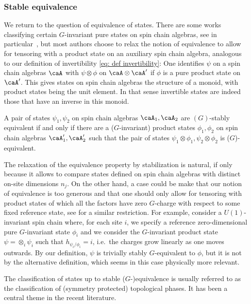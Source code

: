 \subsubsection{Stable equivalence}   \label{sec: stable equivalence}
We return to the question of equivalence of states.  There are some works classifying certain $G$-invariant pure states on spin chain algebras, see in particular~\cite{ogata2021classification}, 
but most authors \cite{kitaev2009periodic,chen_gu_wen_2011,kapustin2021classification} choose to relax the notion of equivalence to allow for tensoring with a product state on an auxiliary spin chain algebra, analogous to our 
definition
of invertibility \eqref{eq: def invertibility}: One identifies $\psi$ on a spin chain algebras $\caA$ with $\psi \otimes \phi$ on $\caA\otimes\caA'$ if $\phi$ is a pure product state on $\caA'$. This gives states on spin chain algebras the structure of a monoid, with product states being the unit element. In that sense invertible states are indeed those that have an inverse in this monoid.   
\begin{definition}
	A pair of states $\psi_1,\psi_2$ on spin chain algebras $\caA_1,\caA_2$ are $(G)$-stably equivalent if and only if there are a ($G$-invariant) product states $\phi_1,\phi_2$ on spin chain algebras $\caA'_1,\caA'_2$  such that the pair of states $\psi_1\otimes \phi_1, \psi_2\otimes \phi_2$ is ($G$)-equivalent.
\end{definition}  
The relaxation of the equivalence property by stabilization is natural, if only because it allows to compare states defined on spin chain algebras with distinct on-site dimensions $n_j$.
On the other hand, a case could be make that our notion of equivalence is too generous and that one should only allow for tensoring with product states of which all the factors have zero $G$-charge with respect to some fixed reference state, see \cite{kapustin2021classification} for a similar restriction.  For example, consider a $U(1)$-invariant spin chain where, for each site $i$, we specify a reference zero-dimensional pure $G$-invariant state $\phi_i$ and we consider the $G$-invariant product state $\psi=\otimes_i \psi_i$ such that 
$h_{\psi_i/\phi_i}=i$, i.e.\ the charges grow linearly as one moves outwards.   By our definition, $\psi$ is trivially stably $G$-equivalent to $\phi$, but it is not by the alternative definition, which seems in this case physically more relevant. 

The classification of states up to stable ($G$-)equivalence is usually referred to as the classification of (symmetry protected) topological phases. It has been a central theme in the recent literature. 

